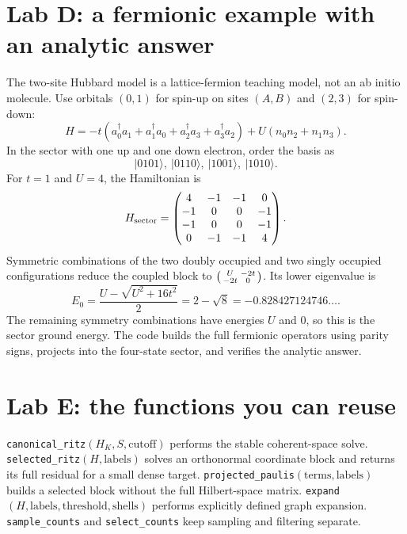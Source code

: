 \documentclass[11pt,a4paper,oneside]{report}
\newcommand{\ket}[1]{\lvert #1\rangle}
\begin{document}
\section{Lab D: a fermionic example with an analytic answer}
The two-site Hubbard model is a lattice-fermion teaching model, not an ab initio molecule. Use orbitals $(0,1)$ for spin-up on sites $(A,B)$ and $(2,3)$ for spin-down:
\begin{equation}
H=-t(a_0^\dagger a_1+a_1^\dagger a_0+a_2^\dagger a_3+a_3^\dagger a_2)
+U(n_0n_2+n_1n_3).
\end{equation}
In the sector with one up and one down electron, order the basis as
\begin{equation}
\ket{0101},\ \ket{0110},\ \ket{1001},\ \ket{1010}.
\end{equation}
For $t=1$ and $U=4$, the Hamiltonian is
\begin{equation}
H_{\rm sector}=\begin{pmatrix}
4&-1&-1&0\\-1&0&0&-1\\-1&0&0&-1\\0&-1&-1&4
\end{pmatrix}.
\end{equation}
Symmetric combinations of the two doubly occupied and two singly occupied configurations reduce the coupled block to $\begin{psmallmatrix}U&-2t\\-2t&0\end{psmallmatrix}$. Its lower eigenvalue is
\begin{equation}
E_0=\frac{U-\sqrt{U^2+16t^2}}2=2-\sqrt8=-0.828427124746\ldots.
\end{equation}
The remaining symmetry combinations have energies $U$ and 0, so this is the sector ground energy. The code builds the full fermionic operators using parity signs, projects into the four-state sector, and verifies the analytic answer.

\section{Lab E: the functions you can reuse}
\texttt{canonical\_ritz}$(H_K,S,\mathrm{cutoff})$ performs the stable coherent-space solve. \texttt{selected\_ritz}$(H,\mathrm{labels})$ solves an orthonormal coordinate block and returns its full residual for a small dense target. \texttt{projected\_paulis}$(\mathrm{terms},\mathrm{labels})$ builds a selected block without the full Hilbert-space matrix. \texttt{expand}$(H,\mathrm{labels},\mathrm{threshold},\mathrm{shells})$ performs explicitly defined graph expansion. \texttt{sample\_counts} and \texttt{select\_counts} keep sampling and filtering separate.
\end{document}
